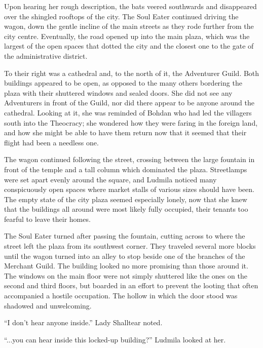 

Upon hearing her rough description, the bats veered southwards and disappeared over the shingled rooftops of the city. The Soul Eater continued driving the wagon, down the gentle incline of the main streets as they rode further from the city centre. Eventually, the road opened up into the main plaza, which was the largest of the open spaces that dotted the city and the closest one to the gate of the administrative district.

 

To their right was a cathedral and, to the north of it, the Adventurer Guild. Both buildings appeared to be open, as opposed to the many others bordering the plaza with their shuttered windows and sealed doors. She did not see any Adventurers in front of the Guild, nor did there appear to be anyone around the cathedral. Looking at it, she was reminded of Bohdan who had led the villagers south into the Theocracy; she wondered how they were faring in the foreign land, and how she might be able to have them return now that it seemed that their flight had been a needless one.

 

The wagon continued following the street, crossing between the large fountain in front of the temple and a tall column which dominated the plaza. Streetlamps were set apart evenly around the square, and Ludmila noticed many conspicuously open spaces where market stalls of various sizes should have been. The empty state of the city plaza seemed especially lonely, now that she knew that the buildings all around were most likely fully occupied, their tenants too fearful to leave their homes.

 

The Soul Eater turned after passing the fountain, cutting across to where the street left the plaza from its southwest corner. They traveled several more blocks until the wagon turned into an alley to stop beside one of the branches of the Merchant Guild. The building looked no more promising than those around it. The windows on the main floor were not simply shuttered like the ones on the second and third floors, but boarded in an effort to prevent the looting that often accompanied a hostile occupation. The hollow in which the door stood was shadowed and unwelcoming.

 

“I don’t hear anyone inside.” Lady Shalltear noted.

 

“...you can hear inside this locked-up building?” Ludmila looked at her.

